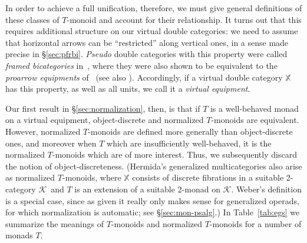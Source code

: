 \documentclass{tac}
\newcommand{\calK}{\ensuremath{\mathcal{K}}}
\numberwithin{equation}{section}
\begin{document}
In order to achieve a full unification, therefore, we must give general
definitions of these classes of $T$-monoid and account for their
relationship.  It turns out that this requires additional structure on
our virtual double categories: we need to assume that horizontal arrows
can be ``restricted'' along vertical ones, in a sense made precise in
\S\ref{sec:pfrbi}.  \emph{Pseudo} double categories with this property
were called \emph{framed bicategories} in~\cite{FramedBicats}, where
they were also shown to be equivalent to the \emph{proarrow equipments}
of~\cite{wood:proarrows-i} (see also \cite{DomThesis}).  Accordingly, if
a virtual double category $\mathbb{X}$ has this property, as well as all
units, we call it a \emph{virtual equipment}.

Our first result in \S\ref{sec:normalization}, then, is that if $T$ is a
well-behaved monad on a virtual equipment, object-discrete and
normalized $T$-monoids are equivalent.  However, normalized $T$-monoids
are defined more generally than object-discrete ones, and moreover when
$T$ which are insufficiently well-behaved, it is the normalized
$T$-monoids which are of more interest.  Thus, we subsequently discard
the notion of object-discreteness.  (Hermida's generalized
multicategories also arise as normalized $T$-monoids, where $\mathbb{X}$
consists of discrete fibrations in a suitable 2-category \calK\ and $T$
is an extension of a suitable 2-monad on \calK.  Weber's definition is a
special case, since as given it really only makes sense for generalized
operads, for which normalization is automatic; see
\S\ref{sec:mon-psalg}.)  In Table~\ref{tab:egs} we summarize the
meanings of $T$-monoids and normalized $T$-monoids for a number of
monads $T$.
\end{document}

